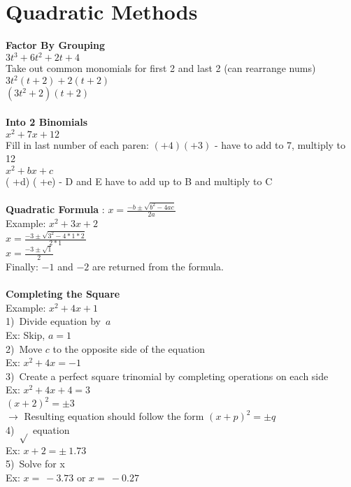 \documentclass{article}
\begin{document}
	\section*{Quadratic Methods}
	\textbf{Factor By Grouping} \\
	$3t^3 + 6t^2 + 2t + 4$  \\
	Take out common monomials for first 2 and last 2 (can rearrange nums) \\
	$3t^2(t + 2) + 2(t+2)$ \\
	$(3t^2 + 2) (t+2)$ \\ \\
	\textbf{Into 2 Binomials} \\
	$x^2 + 7x + 12$ \\
	Fill in last number of each paren: $( + 4) ( + 3)$ - have to add to 7, multiply to 12 \\
	$x^2 + bx + c$ \\
	(  +d) (  +e) - D and E have to add up to B and multiply to C \\\\
	\textbf{Quadratic Formula} : $x=\frac{-b\pm\sqrt{b^2-4ac}}{2a}$ \\
	Example: $x^2+3x+2$ \\
	$x=\frac{-3\pm\sqrt{3^2-4*1*2}}{2*1}$ \\
	$x=\frac{-3\pm\sqrt{1}}{2}$ \\
	Finally: $-1$ and $-2$ are returned from the formula. \\ \\
	\textbf{Completing the Square} \\
	Example: $x^2+4x+1$ \\
	1) Divide equation by $a$ \\
	Ex: Skip, $a=1$\\
	2) Move $c$ to the opposite side of the equation \\
	Ex: $x^2+4x = -1$ \\
	3) Create a perfect square trinomial by completing operations on each side \\
	Ex: $x^2 + 4x + 4 = 3$\\
	$(x+2)^2 = \pm 3$\\
	$\rightarrow$ Resulting equation should follow the form $(x + p)^2 = \pm q$\\
	4) $\sqrt{}$ equation \\
	Ex: $x+2 = \pm ~1.73$ \\
	5) Solve for x\\
	Ex: $x = ~-3.73$ or $x = ~-0.27$
	
\end{document}
